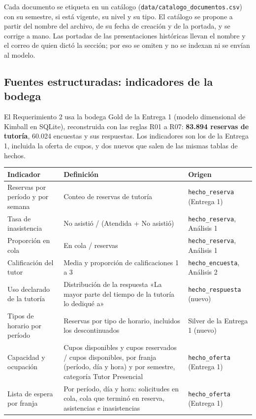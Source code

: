 \documentclass[11pt,letterpaper]{article}
\newcommand{\cod}[1]{\texttt{\small #1}}
\begin{document}
Cada documento se etiqueta en un catálogo (\cod{data/catalogo\_documentos.csv}) con su semestre, si está vigente, su nivel y su tipo. El catálogo se propone a partir del nombre del archivo, de su fecha de creación y de la portada, y se corrige a mano. Las portadas de las presentaciones históricas llevan el nombre y el correo de quien dictó la sección; por eso se omiten y no se indexan ni se envían al modelo.

\subsection{Fuentes estructuradas: indicadores de la bodega}

El Requerimiento 2 usa la bodega Gold de la Entrega 1 (modelo dimensional de Kimball en SQLite), reconstruida con las reglas R01 a R07: \textbf{83.894 reservas de tutoría}, 60.024 encuestas y sus respuestas. Los indicadores son los de la Entrega 1, incluida la oferta de cupos, y dos nuevos que salen de las mismas tablas de hechos.

\begin{table}[H]\small\renewcommand{\arraystretch}{1.15}
\begin{tabularx}{\textwidth}{>{\raggedright\arraybackslash}p{}L>{\raggedright\arraybackslash}p{0.2\textwidth}}
\toprule
\textbf{Indicador} & \textbf{Definición} & \textbf{Origen} \\
\midrule
Reservas por período y por semana & Conteo de reservas de tutoría & \cod{hecho\_reserva} (Entrega 1) \\
Tasa de inasistencia & No asistió / (Atendida + No asistió) & \cod{hecho\_reserva}, Análisis 1 \\
Proporción en cola & En cola / reservas & \cod{hecho\_reserva}, Análisis 1 \\
Calificación del tutor & Media y proporción de calificaciones 1 a 3 & \cod{hecho\_encuesta}, Análisis 2 \\
Uso declarado de la tutoría & Distribución de la respuesta «La mayor parte del tiempo de la tutoría lo dediqué a» & \cod{hecho\_respuesta} (nuevo) \\
Tipos de horario por período & Reservas por tipo de horario, incluidos los descontinuados & Silver de la Entrega 1 (nuevo) \\
Capacidad y ocupación & Cupos disponibles y cupos reservados / cupos disponibles, por franja (período, día y hora) y por semestre, categoría Tutor Presencial & \cod{hecho\_oferta} (Entrega 1) \\
Lista de espera por franja & Por período, día y hora: solicitudes en cola, cola que terminó en reserva, asistencias e inasistencias & \cod{hecho\_oferta} (Entrega 1) \\
\bottomrule
\end{tabularx}
\end{table}
\end{document}
